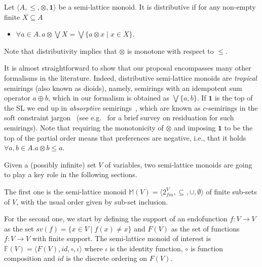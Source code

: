 \documentclass{llncs}
\def\monid{{\mathbf 0}}
\def\monop{\otimes}
\def\odiv{\, {\ominus\hspace{-7.7pt} \div} \,}
\def\monid{\mathbf{1}}
\begin{document}
\begin{definition}[distributivity]
\label{dist}
Let $\langle A, \leq, \monop, \monid \rangle$ be a semi-lattice monoid.
It is distributive if
	for  any  non-empty finite  $X \subseteq A$
	\begin{itemize}
		\item $\forall a \in A.\,  a \monop  \bigvee X = \bigvee \{a \monop x \mid x \in X\}$.
	\end{itemize}

\end{definition}

Note that distributivity implies that $\otimes$ is monotone with respect to $\leq$.
\begin{remark}

	It is almost straightforward to show that our proposal encompasses many other formalisms in the literature.
	Indeed, distributive semi-lattice monoids are \emph{tropical} semirings (also known as dioids), 
	namely, semirings with an idempotent sum operator $a \oplus b$, which in our formalism is obtained as
	$\bigvee \{a, b\}$.
	If $\monid$ is the top of the SL we end up 
	in \emph{absorptive} semirings~\cite{golanShort}, 
	which are known as $c$-semirings 
	in the soft constraint jargon~\cite{jacm97} (see e.g.~\cite{ecai06} for a brief survey on residuation 
	for such semirings).
	Note that requiring the monotonicity of $\otimes$ and imposing $\monid$ to be the top of the partial order
	means that preferences are negative, i.e., 
	that it holds $\forall a, b \in A. a \monop b \leq a$.
\end{remark}

\begin{example}
Given a (possibly infinite) set $V$ of variables, two semi-lattice monoids are going to play a key role in the following sections.

The first one is the semi-lattice monoid 
$\mathbb{M}(V) = \langle 2^V_{fin}, \subseteq, \cup, \emptyset \rangle$
of finite sub-sets of $V$, with the usual order given by sub-set inclusion.

For the second one, we start by defining the support of an endofunction $f\colon V \to V$ as the set $sv(f) = \{ x \in V \mid f(x)\neq x \}$ and
$F(V)$ as the set of functions $f\colon V \to V$ with finite support.
The semi-lattice monoid of interest is  $\mathbb{F}(V) = \langle F(V), id, \circ, \iota \rangle$ where 
$\iota$ is the identity function,  $\circ$ is function composition and $id$ is the discrete ordering on $F(V)$.
\end{example}
\end{document}
